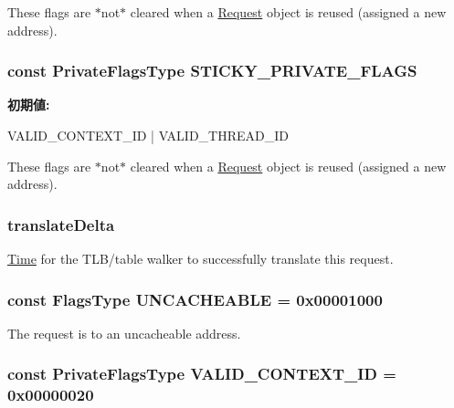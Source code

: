 \label{classRequest_ad6eb90201da8e09a9d6b9029d8a8485c}
These flags are $\ast$not$\ast$ cleared when a \hyperlink{classRequest}{Request} object is reused (assigned a new address). \hypertarget{classRequest_ad84237c624fc4e6ee1465730b92b0a4f}{
\subsubsection[{STICKY\_\-PRIVATE\_\-FLAGS}]{\setlength{\rightskip}{0pt plus 5cm}const {\bf PrivateFlagsType} {\bf STICKY\_\-PRIVATE\_\-FLAGS}}}
\label{classRequest_ad84237c624fc4e6ee1465730b92b0a4f}
{\bfseries 初期値:}
\begin{DoxyCode}

        VALID_CONTEXT_ID | VALID_THREAD_ID
\end{DoxyCode}
These flags are $\ast$not$\ast$ cleared when a \hyperlink{classRequest}{Request} object is reused (assigned a new address). \hypertarget{classRequest_ab7388562dc4c01194509c8eef5084684}{
\subsubsection[{translateDelta}]{ {\bf translateDelta}}}
\label{classRequest_ab7388562dc4c01194509c8eef5084684}
\hyperlink{classTime}{Time} for the TLB/table walker to successfully translate this request. \hypertarget{classRequest_a0fc1d6bc92a0567b05130468e04f05f8}{
\subsubsection[{UNCACHEABLE}]{\setlength{\rightskip}{0pt plus 5cm}const {\bf FlagsType} {\bf UNCACHEABLE} = 0x00001000}}
\label{classRequest_a0fc1d6bc92a0567b05130468e04f05f8}
The request is to an uncacheable address. \hypertarget{classRequest_ad48d87929617331987501ce65f540253}{
\subsubsection[{VALID\_\-CONTEXT\_\-ID}]{\setlength{\rightskip}{0pt plus 5cm}const {\bf PrivateFlagsType} {\bf VALID\_\-CONTEXT\_\-ID} = 0x00000020}}
